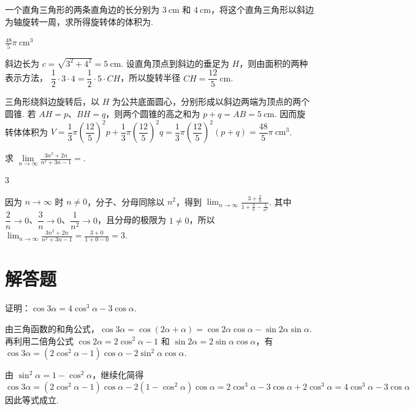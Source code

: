 \begin{problem}
一个直角三角形的两条直角边的长分别为 \(3\mathrm{~cm}\) 和 \(4\mathrm{~cm}\)，将这个直角三角形以斜边为轴旋转一周，求所得旋转体的体积为\fillinblank{}.
\end{problem}

\begin{answer}
\(\frac{48}{5}\pi\mathrm{~cm}^3\)
\end{answer}

\begin{solution}
斜边长为
\(c=\sqrt{3^2+4^2}=5\mathrm{~cm}\). 设直角顶点到斜边的垂足为 \(H\)，则由面积的两种表示方法，
\(\dfrac12\cdot3\cdot4=\dfrac12\cdot5\cdot CH\)，所以旋转半径
\(CH=\dfrac{12}{5}\mathrm{~cm}\).

三角形绕斜边旋转后，以 \(H\) 为公共底面圆心，分别形成以斜边两端为顶点的两个圆锥. 若 \(AH=p\)、\(BH=q\)，则两个圆锥的高之和为 \(p+q=AB=5\mathrm{~cm}\). 因而旋转体体积为
\(V=\dfrac13\pi\left(\dfrac{12}{5}\right)^2p+\dfrac13\pi\left(\dfrac{12}{5}\right)^2q=\dfrac13\pi\left(\dfrac{12}{5}\right)^2\left(p+q\right)=\dfrac{48}{5}\pi\mathrm{~cm}^3\).
\end{solution}

\begin{problem}
求 \(\displaystyle\lim\limits_{n\to\infty}\frac{3n^2 + 2n}{n^2 + 3n - 1}=\)\fillinblank{}.
\end{problem}

\begin{answer}
\(3\)
\end{answer}

\begin{solution}
因为 \(n\to\infty\) 时 \(n\ne0\)，分子、分母同除以 \(n^2\)，得到
\(\displaystyle\lim_{n\to\infty}\frac{3+\frac2n}{1+\frac3n-\frac1{n^2}}\). 其中 \(\dfrac2n\to0\)、\(\dfrac3n\to0\)、\(\dfrac1{n^2}\to0\)，且分母的极限为 \(1\ne0\)，所以
\(\displaystyle\lim_{n\to\infty}\frac{3n^2+2n}{n^2+3n-1}=\frac{3+0}{1+0-0}=3\).
\end{solution}

\section{解答题}

\begin{problem}
证明：\(\cos 3\alpha = 4\cos^3\alpha - 3\cos\alpha\).
\end{problem}

\begin{solution}
由三角函数的和角公式，\(\cos3\alpha=\cos(2\alpha+\alpha)=\cos2\alpha\cos\alpha-\sin2\alpha\sin\alpha\). 再利用二倍角公式 \(\cos2\alpha=2\cos^2\alpha-1\) 和 \(\sin2\alpha=2\sin\alpha\cos\alpha\)，有
\(\cos3\alpha=(2\cos^2\alpha-1)\cos\alpha-2\sin^2\alpha\cos\alpha\).

由 \(\sin^2\alpha=1-\cos^2\alpha\)，继续化简得
\[
\cos3\alpha=(2\cos^2\alpha-1)\cos\alpha-2(1-\cos^2\alpha)\cos\alpha=2\cos^3\alpha-3\cos\alpha+2\cos^3\alpha=4\cos^3\alpha-3\cos\alpha
\]
因此等式成立.
\end{solution}


